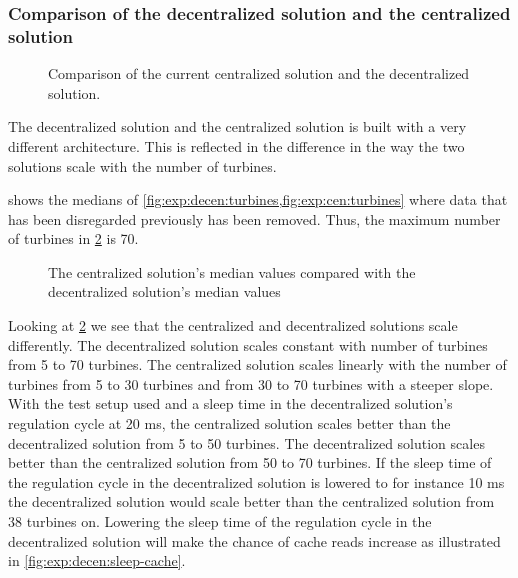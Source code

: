 \subsubsection{Comparison of the decentralized solution and the centralized solution}
\label{sec:comp:decentralizedVScentralized}

\begin{figure}[!h]
	\centering
	
	\caption[Comparison of the current centralized solution and the decentralized solution]{
		\label{fig:projectDiffOverviewCentralizedDecentralized1}
		\footnotesize{%
			Comparison of the current centralized solution and the decentralized solution.
		}
	}
\end{figure}

The decentralized solution and the centralized solution is built with a very different architecture. This is reflected in the difference in the way the two solutions scale with the number of turbines.

 shows the medians of \cref{fig:exp:decen:turbines,fig:exp:cen:turbines} where data that has been disregarded previously has been removed. Thus, the maximum number of turbines in \cref{fig:exp:cenVSDecen} is 70. 

\begin{figure}[h!]
	\centering
		
	\caption{The centralized solution's median values compared with the decentralized solution's median values}
	\label{fig:exp:cenVSDecen}
\end{figure}

Looking at \cref{fig:exp:cenVSDecen} we see that the centralized and decentralized solutions scale differently.
The decentralized solution scales constant with number of turbines from 5 to 70 turbines. The centralized solution scales linearly with the number of turbines from 5 to 30 turbines and from 30 to 70 turbines with a steeper slope. With the test setup used and a sleep time in the decentralized solution's regulation cycle at 20 ms, the centralized solution scales better than the decentralized solution from 5 to 50 turbines. The decentralized solution scales better than the centralized solution from 50 to 70 turbines.
If the sleep time of the regulation cycle in the decentralized solution is lowered to for instance 10 ms the decentralized solution would scale better than the centralized solution from 38 turbines on. Lowering the sleep time of the regulation cycle in the decentralized solution will make the chance of cache reads increase as illustrated in \cref{fig:exp:decen:sleep-cache}.

